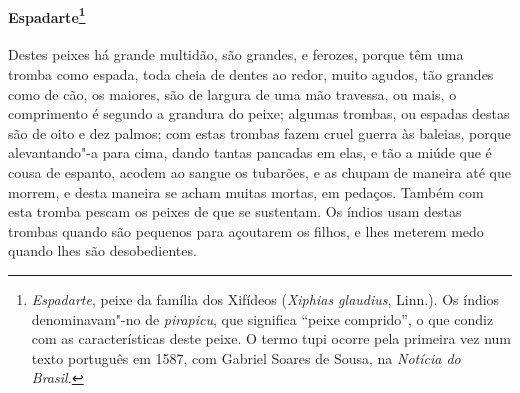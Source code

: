 \paragraph{Espadarte\footnote{ \textit{Espadarte}, peixe da família dos
Xifídeos (\textit{Xiphias glaudius}, Linn.). Os índios denominavam"-no
de \textit{pirapicu}, que significa ``peixe comprido'', o que condiz
com as características deste peixe. O termo tupi ocorre pela primeira
vez num texto português em 1587, com Gabriel Soares de Sousa, na
\textit{Notícia do Brasil.}}} Destes peixes há grande
multidão, são grandes, e ferozes, porque têm uma tromba como espada,
toda cheia de dentes ao redor, muito agudos, tão grandes como de cão,
os maiores, são de largura de uma mão travessa, ou mais, o comprimento
é segundo a grandura do peixe; algumas trombas, ou espadas destas são
de oito e dez palmos; com estas trombas fazem cruel guerra às baleias,
porque alevantando"-a para cima, dando tantas pancadas em elas, e tão a
miúde que é cousa de espanto, acodem ao sangue os tubarões, e as chupam
de maneira até que morrem, e desta maneira se acham muitas mortas, em
pedaços. Também com esta tromba pescam os peixes de que se sustentam.
Os índios usam destas trombas quando são pequenos para açoutarem os
filhos, e lhes meterem medo quando lhes são desobedientes.

